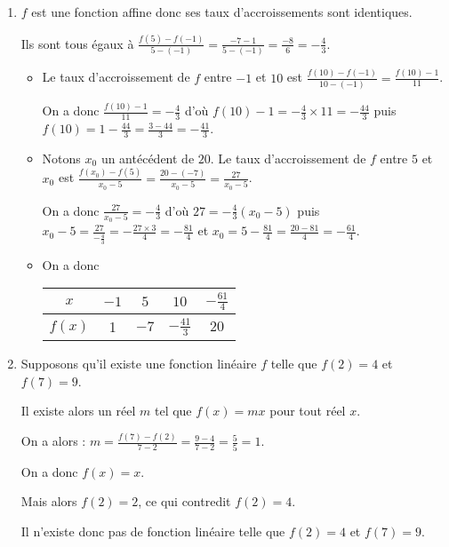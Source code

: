 %
%
%
%
\begin{exr}
  \begin{enumerate}[start=3]
  \item $f$ est une fonction affine donc ses taux d'accroissements sont identiques.
  
  Ils sont tous égaux à $\frac{f(5)-f(-1)}{5-(-1)}=\frac{-7-1}{5-(-1)}=\frac{-8}{6}=-\frac43$.
  
  \begin{itemize}
  \item Le taux d'accroissement de $f$ entre $-1$ et $10$ est $\frac{f(10)-f(-1)}{10-(-1)}=\frac{f(10)-1}{11}$. 

On a  donc  $\frac{f(10)-1}{11}=-\frac43$ d'où $f(10)-1=-\frac{4}{3}\times11=-\frac{44}{3}$ puis $f(10)=1-\frac{44}{3}=\frac{3-44}{3}=-\frac{41}{3}$.
  \item   Notons $x_0$ un antécédent de $20$. Le taux d'accroissement de $f$ entre $5$ et $x_0$ est $\frac{f(x_0)-f(5)}{x_0-5}=\frac{20-(-7)}{x_0-5}=\frac{27}{x_0-5}$.
  
  On a donc $\frac{27}{x_0-5}=-\frac43$ d'où $27=-\frac43(x_0-5)$ puis $x_0-5=\frac{27}{-\frac43}=-\frac{27\times3}{4}=-\frac{81}{4}$ et $x_0=5-\frac{81}{4}=\frac{20-81}{4}=-\frac{61}{4}$.
  \item On a donc 
    \renewcommand{\arraystretch}{1.75}
    \begin{tabular}{|c|c|c|c|c|}\hline
    $x$ & $-1$ & $5$ & $10$ & $-\frac{61}{4}$ \\ \hline
    $f(x)$ &1 &$ -7$&$-\frac{41}{3}$ & $20$ \\ \hline
    \end{tabular}  
  \end{itemize}
  \item Supposons qu'il existe une fonction linéaire $f$ telle que $f(2) = 4$ et $f(7) = 9$.
  
  Il existe alors un réel $m$ tel que $f(x)=mx$ pour tout réel $x$.
  
  On a alors : $m=\frac{f(7)-f(2)}{7-2}=\frac{9-4}{7-2}=\frac55=1$.
  
  On a donc $f(x)=x$.
  
  Mais alors $f(2)=2$, ce qui contredit $f(2)=4$.
  
  Il n'existe donc pas de fonction linéaire telle que $f(2) = 4$ et $f(7) = 9$.
  \end{enumerate}
\end{exr}
%
%
%
